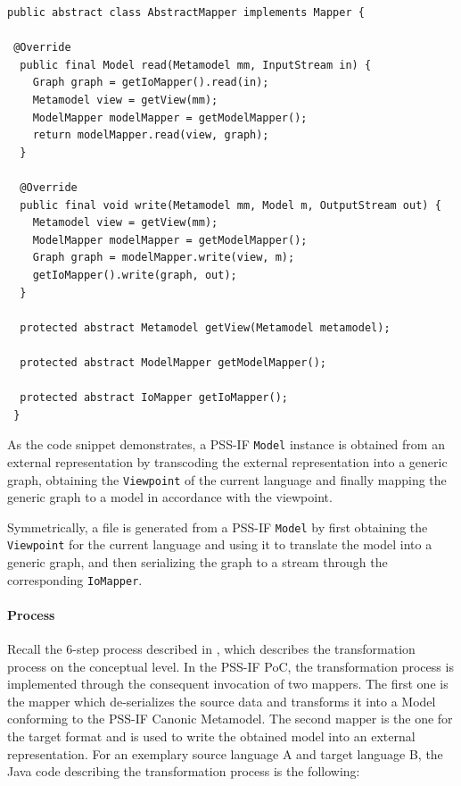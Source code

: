 \begin{verbatim}
public abstract class AbstractMapper implements Mapper {

 @Override
  public final Model read(Metamodel mm, InputStream in) {
    Graph graph = getIoMapper().read(in);
    Metamodel view = getView(mm);
    ModelMapper modelMapper = getModelMapper();
    return modelMapper.read(view, graph);
  }

  @Override
  public final void write(Metamodel mm, Model m, OutputStream out) {
    Metamodel view = getView(mm);
    ModelMapper modelMapper = getModelMapper();
    Graph graph = modelMapper.write(view, m);
    getIoMapper().write(graph, out);
  }

  protected abstract Metamodel getView(Metamodel metamodel);

  protected abstract ModelMapper getModelMapper();

  protected abstract IoMapper getIoMapper();
 }
\end{verbatim}

As the code snippet demonstrates, a PSS-IF \texttt{Model} instance is obtained from an external representation by transcoding the external representation into a generic graph, obtaining the \texttt{Viewpoint} of the current language and finally mapping the generic graph to a model in accordance with the viewpoint.

Symmetrically, a file is generated from a PSS-IF \texttt{Model} by first obtaining the \texttt{Viewpoint} for the current language and using it to translate the model into a generic graph, and then serializing the graph to a stream through the corresponding \texttt{IoMapper}.

\paragraph{Process}

Recall the 6-step process described in , which describes the transformation process on the conceptual level. In the PSS-IF PoC, the transformation process is implemented through the consequent invocation of two mappers. The first one is the mapper which de-serializes the source data and transforms it into a Model conforming to the PSS-IF Canonic Metamodel. The second mapper is the one for the target format and is used to write the obtained model into an external representation. For an exemplary source language A and target language B, the Java code describing the transformation process is the following:

